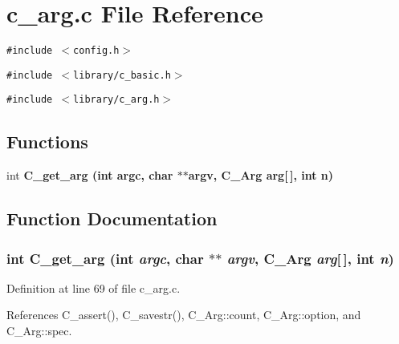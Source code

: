 \section{c\_\-arg.c File Reference}
\label{c__arg_8c}
{\tt \#include $<$config.h$>$}\par
{\tt \#include $<$library/c\_\-basic.h$>$}\par
{\tt \#include $<$library/c\_\-arg.h$>$}\par
\subsection*{Functions}
\begin{CompactItemize}
\item 
int \bf{C\_\-get\_\-arg} (int argc, char $\ast$$\ast$argv, \bf{C\_\-Arg} arg[$\,$], int n)
\end{CompactItemize}


\subsection{Function Documentation}
\subsubsection{\setlength{\rightskip}{0pt plus 5cm}int C\_\-get\_\-arg (int {\em argc}, char $\ast$$\ast$ {\em argv}, \bf{C\_\-Arg} {\em arg}[$\,$], int {\em n})}\label{c__arg_8c_95c2f2213bd62dac92c474e43b107655}




Definition at line 69 of file c\_\-arg.c.

References C\_\-assert(), C\_\-savestr(), C\_\-Arg::count, C\_\-Arg::option, and C\_\-Arg::spec.